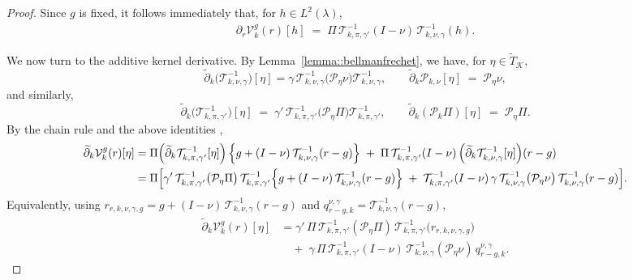 \documentclass[11pt]{article}
\newcommand{\addTK}{\widetilde T_{\mathcal K}}
\newcommand{\adk}{\widetilde{\partial}_k}
\theoremstyle{plain}
\begin{document}
\begin{proof}
Since \(g\) is fixed, it follows immediately that, for $h \in L^2(\lambda)$,
\begin{align*}
    \partial_r \mathcal{V}_k^g(r)[h]
    \;=\; \Pi\,\mathcal{T}_{k,\pi,\gamma'}^{-1}(I-\nu)\,\mathcal{T}_{k,\nu,\gamma}^{-1}(h).
\end{align*}

We now turn to the additive kernel derivative. By Lemma~\ref{lemma::bellmanfrechet}, we have, for $\eta \in \addTK$,
\[
\adk\bigl(\mathcal{T}_{k,\nu,\gamma}^{-1}\bigr)[\eta]
= \gamma \,\mathcal{T}_{k,\nu,\gamma}^{-1}\bigl(\mathcal{P}_{\eta}\nu \bigr)\mathcal{T}_{k,\nu,\gamma}^{-1},
\qquad
\adk \mathcal{P}_{k,\nu}[\eta] \;=\; \mathcal{P}_{\eta}\nu,
\]
and similarly,
\[
\adk\bigl(\mathcal{T}_{k,\pi,\gamma'}^{-1}\bigr)[\eta]
\;=\; \gamma' \,\mathcal{T}_{k,\pi,\gamma'}^{-1}\bigl(\mathcal{P}_{\eta}\Pi \bigr)\mathcal{T}_{k,\pi,\gamma'}^{-1},
\qquad
\adk (\mathcal{P}_{k}\Pi)[\eta] \;=\; \mathcal{P}_{\eta}\Pi.
\]
By the chain rule and the above identities ,
\begin{align*}
\adk \mathcal{V}_k^g(r)[\eta]
&= \Pi\Bigl(\adk \mathcal{T}_{k,\pi,\gamma'}^{-1}[\eta]\Bigr)
      \left\{g + (I-\nu)\,\mathcal{T}_{k,\nu,\gamma}^{-1}(r-g)\right\}
  \;+\; \Pi\,\mathcal{T}_{k,\pi,\gamma'}^{-1}
      (I-\nu)\,\Bigl(\adk \mathcal{T}_{k,\nu,\gamma}^{-1}[\eta]\Bigr)(r-g) \\
&= \Pi\Bigl[
      \gamma'\,\mathcal{T}_{k,\pi,\gamma'}^{-1}\bigl(\mathcal{P}_\eta \Pi\bigr)\,
      \mathcal{T}_{k,\pi,\gamma'}^{-1}\!\left\{g + (I-\nu)\,\mathcal{T}_{k,\nu,\gamma}^{-1}(r-g)\right\}
      \;+\;
      \mathcal{T}_{k,\pi,\gamma'}^{-1}(I-\nu)\,
      \gamma\,\mathcal{T}_{k,\nu,\gamma}^{-1}\bigl(\mathcal{P}_\eta \nu\bigr)\,
      \mathcal{T}_{k,\nu,\gamma}^{-1}(r-g)
    \Bigr].
\end{align*}
Equivalently, using \(r_{r,k,\nu,\gamma,g}= g + (I-\nu)\,\mathcal{T}_{k,\nu,\gamma}^{-1}(r-g)\) and \(q_{r-g,k}^{\nu,\gamma} =  \mathcal{T}_{k,\nu,\gamma}^{-1}(r-g)\),
\begin{align*}
\adk \mathcal{V}_k^g(r)[\eta]
&= \gamma'\,\Pi\,\mathcal{T}_{k,\pi,\gamma'}^{-1}(\mathcal{P}_\eta \Pi)\,
      \mathcal{T}_{k,\pi,\gamma'}^{-1}\bigl(r_{r,k,\nu,\gamma,g}\bigr) \\
&\quad+\; \gamma\,\Pi\,\mathcal{T}_{k,\pi,\gamma'}^{-1}(I-\nu)\,
      \mathcal{T}_{k,\nu,\gamma}^{-1}(\mathcal{P}_\eta \nu)\,
      q_{r-g,k}^{\nu,\gamma}.
\end{align*}



\end{proof}
\end{document}
